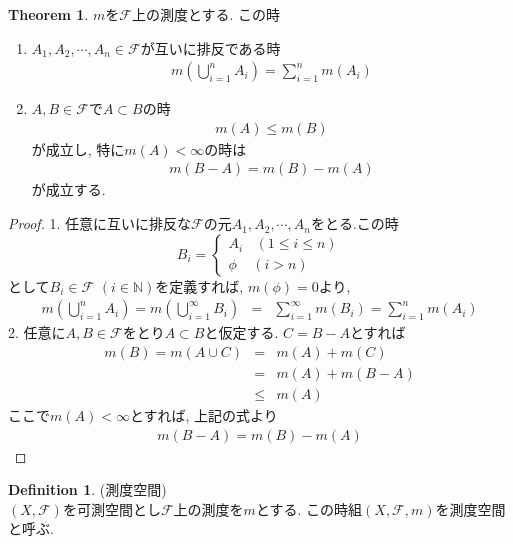 \documentclass[11pt, a4paper, dvipdfmx]{jsbook}
\theoremstyle{definition}
\newtheorem{Definition+}[Axiom+]{Definition}
\newtheorem{Theorem+}[Axiom+]{Theorem}
\newcommand{\N}{\mathbb{N}}
\newcommand{\F}{\mathcal{F}}
\begin{document}
\newpage
\begin{Theorem+}
$m$を$\F$上の測度とする. この時
\begin{enumerate}
  \item $A_{1},A_{2}, \cdots, A_{n}\in\F$が互いに排反である時
  \begin{align*}
      m\left(\bigcup_{i = 1}^{n}A_{i}\right) = \sum_{i = 1}^{n} m(A_{i})
  \end{align*} 
  \item $A, B\in\F$で$A\subset B$の時
  \begin{align*}
    m(A) \leq m(B)
  \end{align*}
  が成立し, 特に$m(A)<\infty$の時は
  \begin{align*}
    m(B - A) = m(B) - m(A)
  \end{align*}
  が成立する.
\end{enumerate}
\begin{proof}
  1. 任意に互いに排反な$\F$の元$A_{1}, A_{2},\cdots, A_{n}$をとる.この時
  \begin{equation*}
    B_{i} =
    \begin{cases}
    A_{i} ~~~~(1 \leq i \leq n) \\
    \phi  ~~~~~(i > n)
  \end{cases}
  \end{equation*}
  として$B_{i}\in\F$ $(i\in\N)$を定義すれば, $m(\phi) = 0$より,
  \begin{eqnarray*}
    m\left(\bigcup_{i = 1}^{n} A_{i}\right) =  m\left(\bigcup_{i = 1}^{\infty} B_{i}\right)&=& \sum_{i = 1}^{\infty}m(B_{i})
                                                = \sum_{i = 1}^{n} m (A_{i})
  \end{eqnarray*}
  2. 任意に$A, B\in\F$をとり$A\subset B$と仮定する. $C = B - A$とすれば
  \begin{eqnarray}
    m(B) = m(A\cup C) &=& m(A) + m(C) \nonumber \\
                      &=& m(A) + m(B-A)\\
                      &\leq&m(A)\nonumber
  \end{eqnarray}
  ここで$m(A)<\infty$とすれば, 上記の式より
  \begin{align*}
    m(B-A) = m(B) - m(A)
  \end{align*}
\end{proof}
\end{Theorem+}  
\begin{Definition+}(測度空間)\\
  $(X, \F)$を可測空間とし$\F$上の測度を$m$とする. この時組$(X, \F, m)$を測度空間と呼ぶ.
\end{Definition+}
\end{document}
